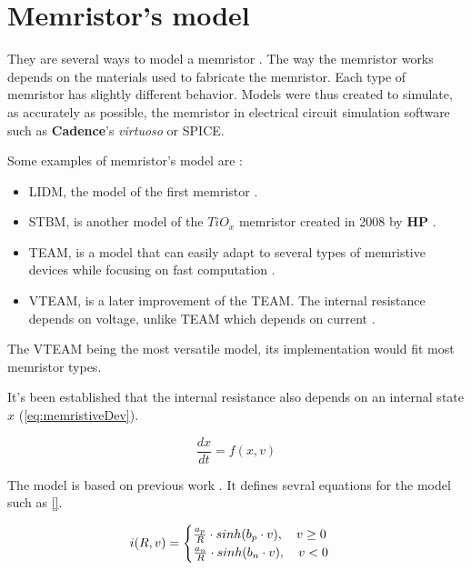 \section{Memristor's model}\label{sec:model}

They are several ways to model a memristor \cite{memristorFab,memTEAMmodel, memVTEAMmodel, memristorSpiceModels}. The way the memristor works depends on the materials used to fabricate the memristor. Each type of memristor has slightly different behavior. Models were thus created to simulate, as accurately as possible, the memristor in electrical circuit simulation software such as \textbf{Cadence}'s \textit{virtuoso} or SPICE.

Some examples of memristor's model are :

\begin{itemize}
\item \acf{LIDM}, the model of the first memristor \cite{memristorFab}.
\item \acf{STBM}, is another model of the $TiO_x$ memristor created in 2008 by \textbf{HP} \cite{memristorFab, memristorSpiceModels}.
\item \acf{TEAM}, is a model that can easily adapt to several types of memristive devices while focusing on fast computation \cite{memTEAMmodel}.
\item \acf{VTEAM}, is a later improvement of the \ac{TEAM}. The internal resistance depends on voltage, unlike \ac{TEAM} which depends on current \cite{memVTEAMmodel}.
\end{itemize}

The \ac{VTEAM} being the most versatile model, its implementation would fit most memristor types.

It's been established that the internal resistance also depends on an internal state $x$ (\cref{eq:memristiveDev}).

\begin{equation}
\frac{dx}{dt}=f(x,v)
  \end{equation}

  The model is based on previous work \cite{memCadenceModel}. It defines sevral equations for the model such as \cref{}.

  \begin{equation}
  i(R,v)=
  \begin{cases}
  \frac{a_p}{R}\cdot sinh(b_p\cdot v), \hspace{10px} v\ge 0\\
    \frac{a_n}{R}\cdot sinh(b_n\cdot v), \hspace{10px} v<0\\
    \end{cases}
    \end{equation}

